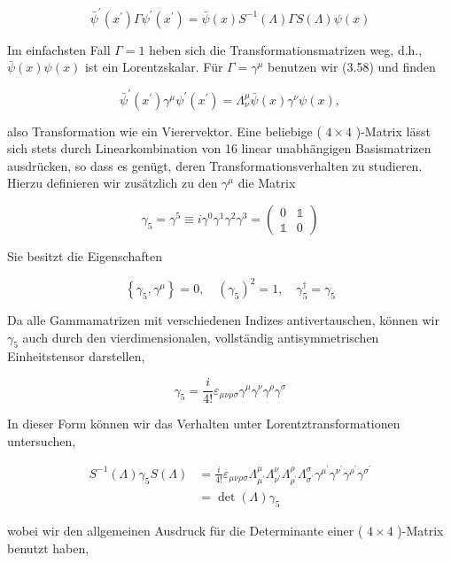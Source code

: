\documentclass[10pt, letterpaper]{article}
\begin{document}
$$
\bar{\psi}^{\prime}\left(x^{\prime}\right) \Gamma \psi^{\prime}\left(x^{\prime}\right)=\bar{\psi}(x) S^{-1}(\Lambda) \Gamma S(\Lambda) \psi(x)
$$

Im einfachsten Fall $\Gamma=1$ heben sich die Transformationsmatrizen weg, d.h., $\bar{\psi}(x) \psi(x)$ ist ein Lorentzskalar. Für $\Gamma=\gamma^{\mu}$ benutzen wir (3.58) und finden

$$
\bar{\psi}^{\prime}\left(x^{\prime}\right) \gamma^{\mu} \psi^{\prime}\left(x^{\prime}\right)=\Lambda_{\nu}^{\mu} \bar{\psi}(x) \gamma^{\nu} \psi(x),
$$

also Transformation wie ein Vierervektor. Eine beliebige ( $4 \times 4$ )-Matrix lässt sich stets durch Linearkombination von 16 linear unabhängigen Basismatrizen ausdrücken, so dass es genügt, deren Transformationsverhalten zu studieren. Hierzu definieren wir zusätzlich zu den $\gamma^{\mu}$ die Matrix

$$
\gamma_{5}=\gamma^{5} \equiv i \gamma^{0} \gamma^{1} \gamma^{2} \gamma^{3}=\left(\begin{array}{ll}
0 & \mathbb{1} \\
\mathbb{1} & 0
\end{array}\right)
$$

Sie besitzt die Eigenschaften

$$
\left\{\gamma_{5}, \gamma^{\mu}\right\}=0, \quad\left(\gamma_{5}\right)^{2}=1, \quad \gamma_{5}^{\dagger}=\gamma_{5}
$$

Da alle Gammamatrizen mit verschiedenen Indizes antivertauschen, können wir $\gamma_{5}$ auch durch den vierdimensionalen, vollständig antisymmetrischen Einheitstensor darstellen,

$$
\gamma_{5}=\frac{i}{4!} \varepsilon_{\mu \nu \rho \sigma} \gamma^{\mu} \gamma^{\nu} \gamma^{\rho} \gamma^{\sigma}
$$

In dieser Form können wir das Verhalten unter Lorentztransformationen untersuchen,

$$
\begin{aligned}
S^{-1}(\Lambda) \gamma_{5} S(\Lambda) & =\frac{i}{4!} \varepsilon_{\mu \nu \rho \sigma} \Lambda_{\mu^{\prime}}^{\mu} \Lambda_{\nu^{\prime}}^{\nu} \Lambda_{\rho^{\prime}}^{\rho} \Lambda_{\sigma^{\prime}}^{\sigma} \gamma^{\mu^{\prime}} \gamma^{\nu^{\prime}} \gamma^{\rho^{\prime}} \gamma^{\sigma^{\prime}} \\
& =\operatorname{det}(\Lambda) \gamma_{5}
\end{aligned}
$$

wobei wir den allgemeinen Ausdruck für die Determinante einer ( $4 \times 4$ )-Matrix benutzt haben,
\end{document}
